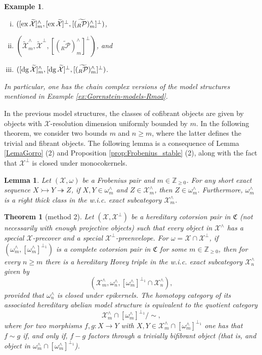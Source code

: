\documentclass[10pt,reqno]{amsart}
\numberwithin{equation}{section}
\newtheorem{example}[definition]{Example}
\newtheorem{theorem}[definition]{Theorem}
\newtheorem{lemma}[definition]{Lemma}
\theoremstyle{remark}
\newcommand{\C}{\mathfrak{C}}
\newcommand{\X}{\mathcal{X}}
\begin{document}
\begin{example}
\begin{enumerate}[(i)]
\item $([{\rm ex}\,\widetilde{\mathcal{X}}]^\wedge_m, [{\rm ex}\,\widetilde{\mathcal{X}}]^\perp, [(\widetilde{{}_R\mathcal{P}})^\wedge_m]^\perp)$,

\item $(\widetilde{\mathcal{X}}^\wedge_m, \widetilde{\mathcal{X}}^\perp, [(\widetilde{{}_R\mathcal{P}})^\wedge_m]^\perp)$, and

\item $([{\rm dg}\,\widetilde{\mathcal{X}}]^\wedge_m, [{\rm dg}\,\widetilde{\mathcal{X}}]^\perp, [(\widetilde{{}_R\mathcal{P}})^\wedge_m]^\perp)$.
\end{enumerate} 
In particular, one has the chain complex versions of the model structures mentioned in Example \ref{ex:Gorenstein-models-Rmod}.
\end{example}


In the previous model structures, the classes of cofibrant objects are given by objects with $\mathcal{X}$-resolution dimension uniformly bounded by $m$. In the following theorem, we consider two bounds $m$ and $n \geq m$, where the latter defines the trivial and fibrant objects. The following lemma is a consequence of Lemma \ref{LemaGorro} (2) and Proposition \ref{prop:Frobenius_stable} (2), along with the fact that $\X^\perp$ is closed under monocokernels. 


\begin{lemma} \label{GruesaIzq}
Let $(\X, \omega)$ be a Frobenius pair and $m \in \mathbb{Z}_{\geq 0}$. For any short exact sequence $X \rightarrowtail Y \twoheadrightarrow Z$, if $X, Y \in \omega^\wedge_m$ and $Z \in \mathcal{X}^\wedge_m$, then $Z \in \omega^\wedge_m$. Furthermore, $\omega^\wedge_m$ is a right thick class in the w.i.c. exact subcategory $\X^\wedge_m$.
\end{lemma}


\begin{theorem}[method 2]\label{thm:models_two_bounds}
Let $(\mathcal{X},\mathcal{X}^\perp)$ be a hereditary cotorsion pair in $\C$ (not necessarily with enough projective objects) such that every object in $\mathcal{X}^\wedge$ has a special $\mathcal{X}$-precover and a special $\X^\perp$-preenvelope.  For $\omega = \mathcal{X} \cap \mathcal{X}^\perp$, if $(\omega^\wedge_m, [\omega^\wedge_m]^{\perp_1})$ is a complete cotorsion pair in $\C$ for some $m \in \mathbb{Z}_{\geq 0}$, then for every $n \geq m$ there is a hereditary Hovey triple in the w.i.c. exact subcategory $\mathcal{X}^\wedge_n$ given by $$(\X^\wedge_m, \omega^\wedge_n, [\omega^\wedge_m]^{\perp_1} \cap \X^\wedge_n),$$ provided that $\omega^\wedge_n$ is closed under epikernels. The homotopy category of its associated hereditary abelian model structure is equivalent to the quotient category $$\X^\wedge_m \cap [\omega^\wedge_m]^{\perp_1} / \sim,$$ where for two morphisms $f, g \colon X \to Y$ with $X, Y \in \X^\wedge_m \cap [\omega^\wedge_m]^{\perp_1}$ one has that $f \sim g$ if, and only if, $f - g$ factors through a trivially bifibrant object (that is, and object in $\omega^\wedge_m \cap [\omega^\wedge_m]^{\perp_1}$). 
\end{theorem}
\end{document}
